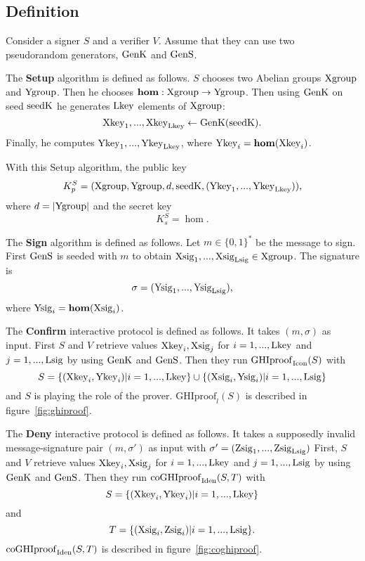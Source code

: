 \subsection{Definition}
Consider a signer $S$ and a verifier $V$. Assume that they can use two pseudorandom generators,
$\mathrm{GenK}$ and $\mathrm{GenS}$. 

The {\bf Setup} algorithm is defined as follows.
$S$ chooses two Abelian groups $\mathrm{Xgroup}$ and $\mathrm{Ygroup}$. Then he chooses 
$\mathbf{hom}: \mathrm{Xgroup} \rightarrow \mathrm{Ygroup}$. Then using $\mathrm{GenK}$ on seed $\mathrm{seedK}$ he generates 
$\mathrm{Lkey}$ elements of $\mathrm{Xgroup}$:
\[
\mathrm{Xkey}_{1},...,\mathrm{Xkey}_{\mathrm{Lkey}} \leftarrow \mathrm{GenK}(\mathrm{seedK}).
\]
Finally, he computes $\mathrm{Ykey}_{1},...,\mathrm{Ykey}_{\mathrm{Lkey}}$, where $\mathrm{Ykey}_{i} = \mathbf{hom}(\mathrm{Xkey}_{i})$.

With this Setup algorithm, the public key 
\[
    K_p^{S} = (\mathrm{Xgroup},\mathrm{Ygroup},d,\mathrm{seedK},(\mathrm{Ykey}_{1},...,\mathrm{Ykey}_{\mathrm{Lkey}})), 
\]
where $ d = |\mathrm{Ygroup}|$ and the secret key
\[
    K_s^{S} = \hom.
\]

The {\bf Sign} algorithm is defined as follows.
Let $m \in \{0,1\}^*$ be the message to sign. First $\mathrm{GenS}$ is seeded with $m$ to obtain
$\mathrm{Xsig}_{1},...,\mathrm{Xsig}_{\mathrm{Lsig}} \in \mathrm{Xgroup}$. The signature is 
\[
    \sigma = (\mathrm{Ysig}_{1},...,\mathrm{Ysig}_{\mathrm{Lsig}}),
\]
where $\mathrm{Ysig}_{i} = \mathbf{hom}(\mathrm{Xsig}_{i})$.

The {\bf Confirm} interactive protocol is defined as follows.
It takes $(m,\sigma)$ as input. First $S$ and $V$ retrieve values $\mathrm{Xkey}_{i},\mathrm{Xsig}_{j}$ for
$i = 1,...,\mathrm{Lkey}$ and $j = 1,...,\mathrm{Lsig}$ by using $\mathrm{GenK}$ and $\mathrm{GenS}$.
Then they run $\mathrm{GHIproof}_{\mathrm{Icon}}(S)$ with 
\[
S = \{(\mathrm{Xkey}_{i},\mathrm{Ykey}_{i})| i = 1,...,\mathrm{Lkey}\} \cup \{(\mathrm{Xsig}_{i},\mathrm{Ysig}_{i})| i = 1,...,\mathrm{Lsig}\}
\]
and $S$ is playing the role of the prover.
$\mathrm{GHIproof}_{l}(S)$ is described in figure~\ref{fig:ghiproof}.

The {\bf Deny} interactive protocol is defined as follows.
It takes a supposedly invalid message-signature pair $(m,\sigma')$ as input with $\sigma' = (\mathrm{Zsig}_{1},...,\mathrm{Zsig}_{\mathrm{Lsig}})$
First, $S$ and $V$ retrieve values $\mathrm{Xkey}_{i},\mathrm{Xsig}_{j}$ for
$i = 1,...,\mathrm{Lkey}$ and $j = 1,...,\mathrm{Lsig}$ by using $\mathrm{GenK}$ and $\mathrm{GenS}$.
Then they run  $\mathrm{coGHIproof}_{\mathrm{Iden}}(S,T)$ with 
\[
S = \{(\mathrm{Xkey}_{i},\mathrm{Ykey}_{i})|i=1,...,\mathrm{Lkey}\}
\]
and 
\[
T = \{(\mathrm{Xsig}_{i},\mathrm{Zsig}_{i})|i=1,...,\mathrm{Lsig}\}.
\]
$\mathrm{coGHIproof}_{\mathrm{Iden}}(S,T)$ is described in figure~\ref{fig:coghiproof}. 


